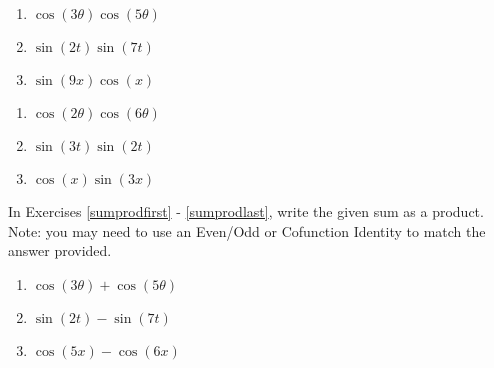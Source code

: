 \begin{multicols}{3}

\begin{enumerate}

\setcounter{enumi}{\value{HW}}

\item $\cos(3\theta)\cos(5\theta)$ \label{prodsumfirst}
\item $\sin(2t)\sin(7t)$
\item $\sin(9x)\cos(x)$

\setcounter{HW}{\value{enumi}}

\end{enumerate}

\end{multicols}

\begin{multicols}{3}

\begin{enumerate}

\setcounter{enumi}{\value{HW}}

\item $\cos(2\theta) \cos(6\theta)$
\item $\sin(3t) \sin(2t)$
\item $\cos(x) \sin(3x)$ \label{prodsumlast}

\setcounter{HW}{\value{enumi}}

\end{enumerate}

\end{multicols}

In Exercises \ref{sumprodfirst} - \ref{sumprodlast},  write the given sum as a product. Note:  you may need to use an Even/Odd or Cofunction Identity to match the answer provided.

\begin{multicols}{3}

\begin{enumerate}

\setcounter{enumi}{\value{HW}}

\item $\cos(3\theta) + \cos(5\theta)$ \label{sumprodfirst}
\item $\sin(2t) - \sin(7t)$
\item $\cos(5x) - \cos(6x)$

\setcounter{HW}{\value{enumi}}

\end{enumerate}

\end{multicols}

